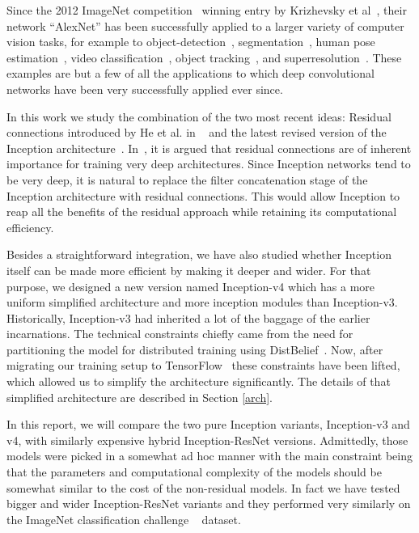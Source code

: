 \documentclass[10pt,twocolumn,letterpaper]{article}
\begin{document}
Since the 2012 ImageNet competition~\cite{russakovsky2014imagenet}
winning entry by Krizhevsky et al~\cite{krizhevsky2012imagenet},
their network ``AlexNet'' has been successfully applied to a larger variety of
computer vision tasks, for example to object-detection~\cite{girshick2014rcnn},
segmentation~\cite{long2015fully}, human pose estimation~\cite{toshev2014deeppose},
video classification~\cite{karpathy2014large}, object
tracking~\cite{wang2013learning}, and superresolution~\cite{dong2014learning}.
These examples are but a few of all the applications to which deep
convolutional networks have been very successfully applied ever since.

In this work we study the combination of the two most recent ideas:
Residual connections introduced by He et al. in ~\cite{he2015deep} and the latest
revised version of the Inception architecture~\cite{szegedy2015rethinking}.
In~\cite{he2015deep}, it is argued that residual connections are of inherent
importance for training very deep architectures. Since Inception networks
tend to be very deep, it is natural to replace the
filter concatenation stage of the Inception architecture with residual connections. This
would allow Inception to reap all the benefits of the residual approach
while retaining its computational efficiency.

Besides a straightforward integration, we have also studied whether
Inception itself can be made more efficient by making it deeper and wider.
For that purpose, we designed a new version named Inception-v4
which has a more uniform simplified architecture and more inception modules
than Inception-v3. Historically, Inception-v3 had inherited a lot of the
baggage of the earlier incarnations. The technical constraints chiefly came from
the need for partitioning the model for distributed training using
DistBelief~\cite{dean2012large}.
Now, after migrating our training setup to TensorFlow~\cite{tensorflow2015-whitepaper}
these constraints have been lifted, which allowed us to simplify the architecture
significantly. The details of that simplified architecture are described in Section \ref{arch}.

In this report, we will compare the two pure Inception variants,
Inception-v3 and v4, with similarly expensive hybrid Inception-ResNet
versions. Admittedly, those models were picked in a somewhat ad hoc manner
with the main constraint being that the parameters and computational
complexity of the models should be somewhat similar to the cost
of the non-residual models. In fact we have tested bigger and wider
Inception-ResNet variants and they performed very similarly on the
ImageNet classification challenge ~\cite{russakovsky2014imagenet}
dataset.
\end{document}
